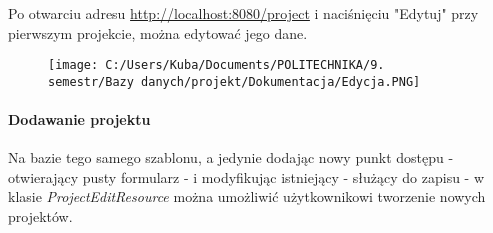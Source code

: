 \documentclass[]{article}
\let\oldparagraph\paragraph
\renewcommand{\paragraph}[1]{\oldparagraph{#1}\mbox{}}
\begin{document}
Po otwarciu adresu \url{http://localhost:8080/project} i naciśnięciu
"Edytuj" przy pierwszym projekcie, można edytować jego dane.

\begin{figure}
\centering
\texttt{[image: C:/Users/Kuba/Documents/POLITECHNIKA/9. semestr/Bazy danych/projekt/Dokumentacja/Edycja.PNG]}
\caption{}
\end{figure}

\hypertarget{header-n161}{%
\paragraph{Dodawanie projektu}\label{header-n161}}

Na bazie tego samego szablonu, a jedynie dodając nowy punkt dostępu -
otwierający pusty formularz - i modyfikując istniejący - służący do
zapisu - w klasie \emph{ProjectEditResource} można umożliwić
użytkownikowi tworzenie nowych projektów.
\end{document}
